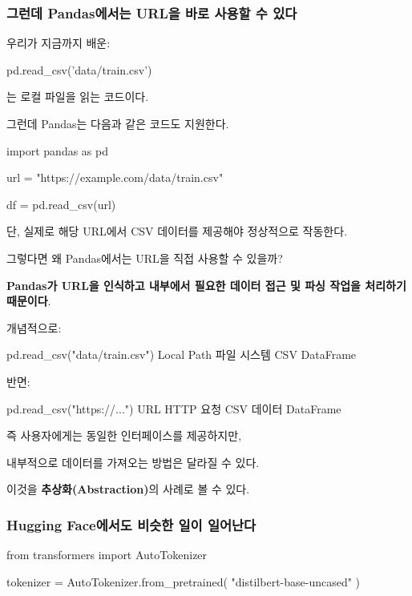 \subsubsection{그런데 Pandas에서는 URL을 바로 사용할 수 있다}

우리가 지금까지 배운:

\begin{dhkcode}
pd.read_csv('data/train.csv')
\end{dhkcode}

는 로컬 파일을 읽는 코드이다.

그런데 Pandas는 다음과 같은 코드도 지원한다.

\begin{dhkcode}
import pandas as pd

url = "https://example.com/data/train.csv"

df = pd.read_csv(url)
\end{dhkcode}

단, 실제로 해당 URL에서 CSV 데이터를 제공해야 정상적으로 작동한다.

그렇다면 왜 Pandas에서는 URL을 직접 사용할 수 있을까?

\textbf{Pandas가 URL을 인식하고 내부에서 필요한 데이터 접근 및 파싱 작업을 처리하기 때문이다}.

개념적으로:

\begin{dhksmry}[centered]
pd.read_csv("data/train.csv")
\da
Local Path
\da
파일 시스템
\da
CSV
\da
DataFrame
\end{dhksmry}

반면:

\begin{dhksmry}[centered]
pd.read_csv("https://...")
\da
URL
\da
HTTP 요청
\da
CSV 데이터
\da
DataFrame
\end{dhksmry}

즉 사용자에게는 동일한 인터페이스를 제공하지만,

내부적으로 데이터를 가져오는 방법은 달라질 수 있다.

이것을 \textbf{추상화(Abstraction)}의 사례로 볼 수 있다.

\subsubsection{Hugging Face에서도 비슷한 일이 일어난다}

\begin{dhkcode}
from transformers import AutoTokenizer

tokenizer = AutoTokenizer.from_pretrained(
    "distilbert-base-uncased"
)
\end{dhkcode}


